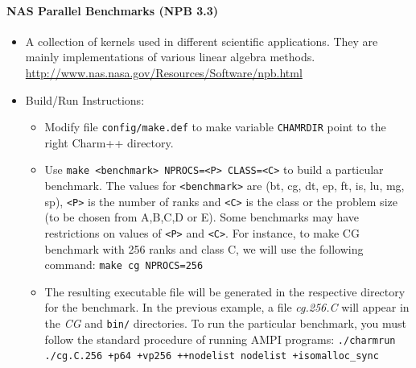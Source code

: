 \documentclass[10pt]{article}
\begin{document}
\paragraph{NAS Parallel Benchmarks (NPB 3.3)}
    \begin{itemize}
    \item
      A collection of kernels used in different scientific applications.
      They are mainly implementations of various linear algebra
      methods. \url{http://www.nas.nasa.gov/Resources/Software/npb.html}
    \item
      Build/Run Instructions:
      \begin{itemize}
      \item
        Modify file \texttt{config/make.def} to make
        variable \texttt{CHAMRDIR} point to the right Charm++ directory.
      \item
        Use \texttt{make \textless{}benchmark\textgreater{}
        NPROCS=\textless{}P\textgreater{}
        CLASS=\textless{}C\textgreater{}} to build a particular
        benchmark. The values
        for \texttt{\textless{}benchmark\textgreater{}} are (bt, cg, dt,
        ep, ft, is, lu, mg, sp), \texttt{\textless{}P\textgreater{}} is
        the number of ranks and \texttt{\textless{}C\textgreater{}} is the
        class or the problem size (to be chosen from A,B,C,D or E). Some
        benchmarks may have restrictions on values
        of \texttt{\textless{}P\textgreater{}} and \texttt{\textless{}C\textgreater{}}.
        For instance, to make CG benchmark with 256 ranks and class C,
        we will use the following command: \texttt{make cg NPROCS=256}
      \item
        The resulting executable file will be generated in the
        respective directory for the benchmark. In the previous example,
        a file \emph{cg.256.C} will appear in the \emph{CG} and \texttt{bin/} directories.
        To run the particular benchmark, you must follow the standard
        procedure of running AMPI programs: \texttt{./charmrun ./cg.C.256 +p64
        +vp256 ++nodelist nodelist +isomalloc\_sync}
      \end{itemize}
    \end{itemize}
\end{document}
